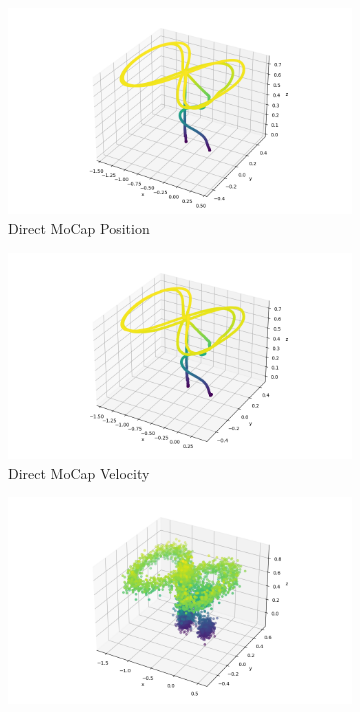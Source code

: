 \documentclass{article}
\begin{document}
\begin{figure}[H]
    \centering
    \begin{subfigure}{0.45\textwidth}
        \includegraphics[width=\textwidth]{imgs/task2_mocap.png}
        \caption{Direct MoCap Position}
    \end{subfigure}
    \begin{subfigure}{0.45\textwidth}
        \includegraphics[width=\textwidth]{imgs/task2_velocity.png}
        \caption{Direct MoCap Velocity}
    \end{subfigure}
    \begin{subfigure}{0.45\textwidth}
        \includegraphics[width=\textwidth]{imgs/task2_low_noise.png}

\end{subfigure}
\end{figure}
\end{document}
